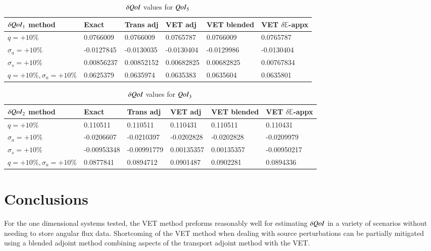 \documentclass{anstrans}
\newcommand{\Edd}{\mathbb{E}}
\newcommand{\sigs}{\sigma_s}
\newcommand{\siga}{\sigma_a}
\newcommand{\qoi}{{\it QoI}\xspace}
\begin{document}
\begin{table}
  \centering
  \caption{$\delta \qoi$ values for $\qoi_5$}
  \begin{tabular}{l|lllll}\toprule
  $\delta\qoi_1$ method    & Exact     & Trans adj     & VET adj      &   VET blended  & VET $\delta \Edd$-appx 
\\ \midrule
$q=+10\%$  & 0.0766009  & 0.0766009  & 0.0765787 & 0.0766009  & 0.0765787
\\
$\siga=+10\%$  &-0.0127845  & -0.0130035 & -0.0130404  & -0.0129986 & -0.0130404
\\
$\sigs=+10\%$  & 0.00856237  & 0.00852152  & 0.00682825  & 0.00682825  & 0.00767834 
\\
$q=+10\%,\siga=+10\%$  & 0.0625379 & 0.0635974  & 0.0635383 & 0.0635604  &  0.0635801 
\\
\bottomrule
\end{tabular}
  \label{tab:qoi1}
\end{table}


\begin{table}
  \centering
  \caption{$\delta \qoi$ values for $\qoi_3$}
  \begin{tabular}{l|lllll}\toprule
  $\delta\qoi_2$ method    & Exact     & Trans adj     & VET adj      &   VET blended  & VET $\delta \Edd$-appx 
\\ \midrule
$q=+10\%$  & 0.110511   & 0.110511   & 0.110431 & 0.110511   & 0.110431 
\\
$\siga=+10\%$  &-0.0206607  & -0.0210397 & -0.0202828   & -0.0202828  & -0.0209979
\\
$\sigs=+10\%$  & -0.00953348   & -0.00991779   & 0.00135357   & 0.00135357   & -0.00950217 
\\
$q=+10\%,\siga=+10\%$  & 0.0877841  & 0.0894712   & 0.0901487 & 0.0902281   &  0.0894336  
\\
\bottomrule
\end{tabular}
  \label{tab:qoi2}
\end{table}



\section{Conclusions}
For the one dimensional systems tested, the VET method preforms reasonably well for estimating $\delta \qoi$ in a  variety of scenarios without needing to store angular flux data. Shortcoming of the VET method when dealing with source perturbations can be partially mitigated using a blended adjoint method combining aspects of the transport adjoint method with the VET. 
\end{document}
